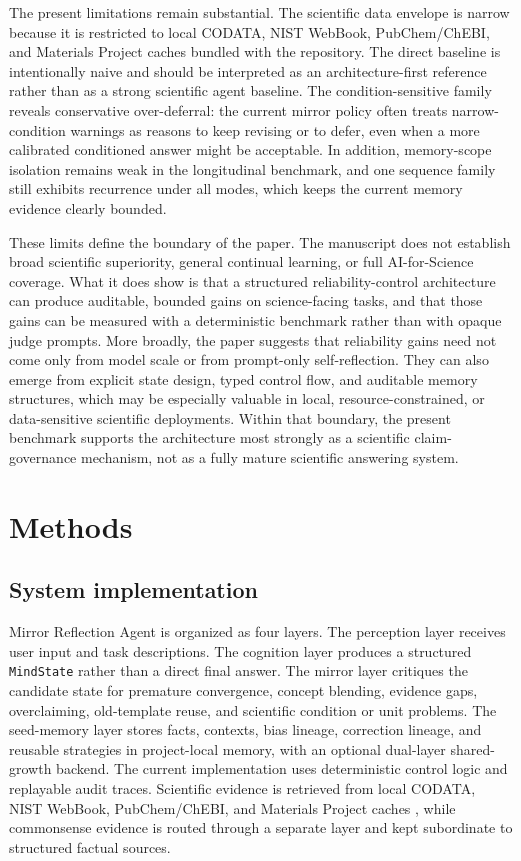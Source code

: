 \documentclass[12pt]{article}
\begin{document}
The present limitations remain substantial. The scientific data envelope is narrow because it is restricted to local CODATA, NIST WebBook, PubChem/ChEBI, and Materials Project caches bundled with the repository. The direct baseline is intentionally naive and should be interpreted as an architecture-first reference rather than as a strong scientific agent baseline. The condition-sensitive family reveals conservative over-deferral: the current mirror policy often treats narrow-condition warnings as reasons to keep revising or to defer, even when a more calibrated conditioned answer might be acceptable. In addition, memory-scope isolation remains weak in the longitudinal benchmark, and one sequence family still exhibits recurrence under all modes, which keeps the current memory evidence clearly bounded.

These limits define the boundary of the paper. The manuscript does not establish broad scientific superiority, general continual learning, or full AI-for-Science coverage. What it does show is that a structured reliability-control architecture can produce auditable, bounded gains on science-facing tasks, and that those gains can be measured with a deterministic benchmark rather than with opaque judge prompts. More broadly, the paper suggests that reliability gains need not come only from model scale or from prompt-only self-reflection. They can also emerge from explicit state design, typed control flow, and auditable memory structures, which may be especially valuable in local, resource-constrained, or data-sensitive scientific deployments. Within that boundary, the present benchmark supports the architecture most strongly as a scientific claim-governance mechanism, not as a fully mature scientific answering system.

\section{Methods}

\subsection{System implementation}

Mirror Reflection Agent is organized as four layers. The perception layer receives user input and task descriptions. The cognition layer produces a structured \texttt{MindState} rather than a direct final answer. The mirror layer critiques the candidate state for premature convergence, concept blending, evidence gaps, overclaiming, old-template reuse, and scientific condition or unit problems. The seed-memory layer stores facts, contexts, bias lineage, correction lineage, and reusable strategies in project-local memory, with an optional dual-layer shared-growth backend. The current implementation uses deterministic control logic and replayable audit traces. Scientific evidence is retrieved from local CODATA, NIST WebBook, PubChem/ChEBI, and Materials Project caches \cite{codata2018,nistwebbook,pubchem2023,chebi2013,materialsproject}, while commonsense evidence is routed through a separate layer and kept subordinate to structured factual sources.
\end{document}
